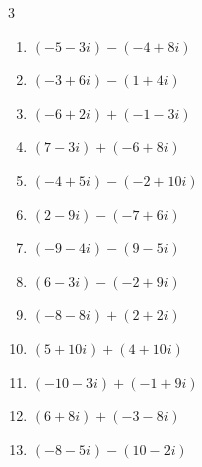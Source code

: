 \begin{multicols}{3}
\begin{enumerate}
        \phantom{$\displaystyle =-1-13i$}

  \item $\displaystyle (-5-3i) - (-4+8i)$

        \phantom{$\displaystyle =-1-11i$}

  \item $\displaystyle (-3+6i) - (1+4i)$

        \phantom{$\displaystyle =-4+2i$}

  \item $\displaystyle (-6+2i) + (-1-3i)$

        \phantom{$\displaystyle =-7-i$}

  \item $\displaystyle (7-3i) + (-6+8i)$

        \phantom{$\displaystyle =1+5i$}

\columnbreak %

  \item $\displaystyle (-4+5i) - (-2+10i)$

        \phantom{$\displaystyle =-2-5i$}

  \item $\displaystyle (2-9i) - (-7+6i)$

        \phantom{$\displaystyle =9-15i$}

  \item $\displaystyle (-9-4i) - (9-5i)$

        \phantom{$\displaystyle =-18+i$}

  \item $\displaystyle (6-3i) - (-2+9i)$

        \phantom{$\displaystyle =8-12i$}

  \item $\displaystyle (-8-8i) + (2+2i)$

        \phantom{$\displaystyle =-6-6i$}

  \item $\displaystyle (5+10i) + (4+10i)$

        \phantom{$\displaystyle =9+20i$}

  \item $\displaystyle (-10-3i) + (-1+9i)$

        \phantom{$\displaystyle =-11+6i$}

  \item $\displaystyle (6+8i) + (-3-8i)$

        \phantom{$\displaystyle =3$}

  \item $\displaystyle (-8-5i) - (10-2i)$


\end{enumerate}
\end{multicols}
